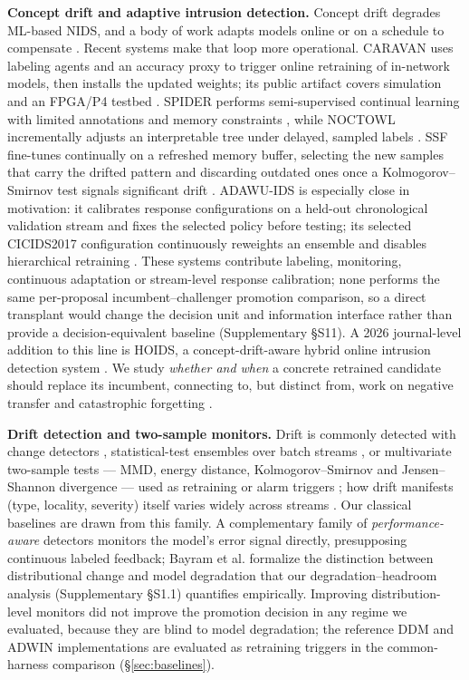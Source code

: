 \documentclass[a4paper,fleqn]{cas-sc}
\begin{document}
\textbf{Concept drift and adaptive intrusion detection.} Concept drift degrades ML-based NIDS, and a body of work adapts models online or on a schedule to compensate \cite{gama2014survey,lu2019learning,shyaa2024evolving}. Recent systems make that loop more operational. CARAVAN uses labeling agents and an accuracy proxy to trigger online retraining of in-network models, then installs the updated weights; its public artifact covers simulation and an FPGA/P4 testbed \cite{zhang2024caravan}. SPIDER performs semi-supervised continual learning with limited annotations and memory constraints \cite{amalapuram2024spider}, while NOCTOWL incrementally adjusts an interpretable tree under delayed, sampled labels \cite{pederzoli2025noctowl}. SSF fine-tunes continually on a refreshed memory buffer, selecting the new samples that carry the drifted pattern and discarding outdated ones once a Kolmogorov--Smirnov test signals significant drift \cite{zhang2025ssf}. ADAWU-IDS is especially close in motivation: it calibrates response configurations on a held-out chronological validation stream and fixes the selected policy before testing; its selected CICIDS2017 configuration continuously reweights an ensemble and disables hierarchical retraining \cite{yuan2026adawu}. These systems contribute labeling, monitoring, continuous adaptation or stream-level response calibration; none performs the same per-proposal incumbent--challenger promotion comparison, so a direct transplant would change the decision unit and information interface rather than provide a decision-equivalent baseline (Supplementary \S S11). A 2026 journal-level addition to this line is HOIDS, a concept-drift-aware hybrid online intrusion detection system \cite{depaola2026hoids}. We study \emph{whether and when} a concrete retrained candidate should replace its incumbent, connecting to, but distinct from, work on negative transfer and catastrophic forgetting \cite{mccloskey1989catastrophic,kirkpatrick2017overcoming,zhang2023survey}.


\textbf{Drift detection and two-sample monitors.} Drift is commonly detected with change detectors \cite{bifet2007learning,gama2004learning,baena2006early,raab2020reactive}, statistical-test ensembles over batch streams \cite{komorniczak2022ensemble}, or multivariate two-sample tests --- MMD, energy distance, Kolmogorov--Smirnov and Jensen--Shannon divergence --- used as retraining or alarm triggers \cite{gretton2012kernel,rizzo2016energy,lin1991divergence,darling1957ks}; how drift manifests (type, locality, severity) itself varies widely across streams \cite{aguiar2024locality}. Our classical baselines are drawn from this family. A complementary family of \emph{performance-aware} detectors monitors the model's error signal directly, presupposing continuous labeled feedback; Bayram et al. \cite{bayram2022degradation} formalize the distinction between distributional change and model degradation that our degradation--headroom analysis (Supplementary \S S1.1) quantifies empirically. Improving distribution-level monitors did not improve the promotion decision in any regime we evaluated, because they are blind to model degradation; the reference DDM and ADWIN implementations are evaluated as retraining triggers in the common-harness comparison (\S\ref{sec:baselines}).
\end{document}
